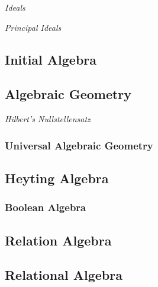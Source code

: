 \documentclass{article}
\begin{document}
\emph{Ideals}

\emph{Principal Ideals}

\subsection{Initial Algebra}\label{subsec:initial_algebra}

\subsection{Algebraic Geometry}\label{subsec:algebraic_geometry}

\emph{Hilbert's Nullstellensatz}

\subsubsection{Universal Algebraic Geometry}

\subsection{Heyting Algebra}\label{subsec:heyting_algebra}

\subsubsection{Boolean Algebra}\label{subsec:boolean_algebra}

\subsection{Relation Algebra}

\subsection{Relational Algebra}
\end{document}
